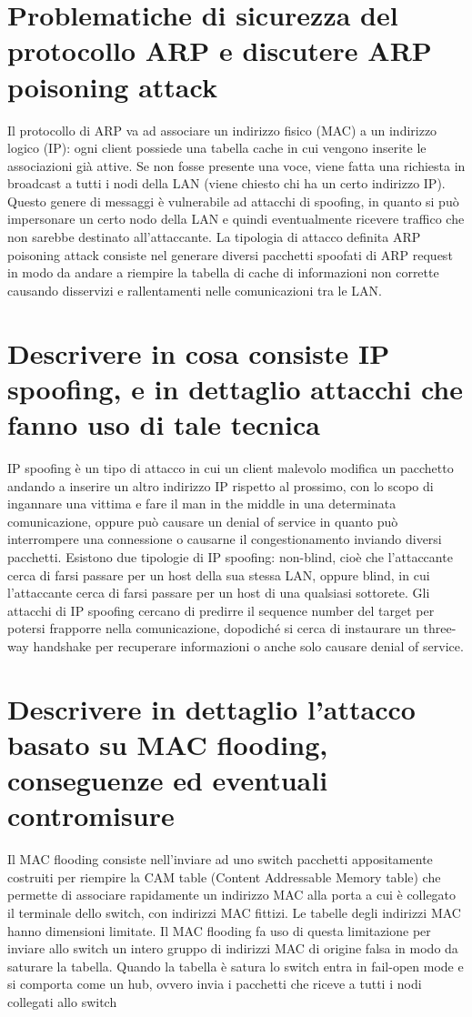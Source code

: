 \documentclass{report}
\begin{document}
\section{Problematiche di sicurezza del protocollo ARP e discutere ARP poisoning attack}
Il protocollo di ARP va ad associare un indirizzo fisico (MAC) a un indirizzo logico (IP): ogni client possiede una tabella cache in cui vengono inserite le associazioni già attive. Se non fosse presente una voce, viene fatta una richiesta in broadcast a tutti i nodi della LAN (viene chiesto chi ha un certo indirizzo IP).
Questo genere di messaggi è vulnerabile ad attacchi di spoofing, in quanto si può impersonare un certo nodo della LAN e quindi eventualmente ricevere traffico che non sarebbe destinato all’attaccante.
La tipologia di attacco definita ARP poisoning attack consiste nel generare diversi pacchetti spoofati di ARP request in modo da andare a riempire la tabella di cache di informazioni non corrette causando disservizi e rallentamenti nelle comunicazioni tra le LAN.

\section{Descrivere in cosa consiste IP spoofing, e in dettaglio attacchi che fanno uso di tale tecnica}
IP spoofing è un tipo di attacco in cui un client malevolo modifica un pacchetto andando a inserire un altro indirizzo IP rispetto al prossimo, con lo scopo di ingannare una vittima e fare il man in the middle in una determinata comunicazione, oppure può causare un denial of service in quanto può interrompere una connessione o causarne il congestionamento inviando diversi pacchetti.
Esistono due tipologie di IP spoofing: non-blind, cioè che l'attaccante cerca di farsi passare per un host della sua stessa LAN, oppure blind, in cui l’attaccante cerca di farsi passare per un host di una qualsiasi sottorete.
Gli attacchi di IP spoofing cercano di predirre il sequence number del target per potersi frapporre nella comunicazione, dopodiché si cerca di instaurare un three-way handshake per recuperare informazioni o anche solo causare denial of service.


\section{Descrivere in dettaglio l'attacco basato su MAC flooding, conseguenze ed eventuali contromisure}
Il MAC flooding consiste nell'inviare ad uno switch pacchetti appositamente costruiti per riempire la CAM table (Content Addressable Memory table) che permette di associare rapidamente un indirizzo MAC alla porta a cui è collegato il terminale dello switch, con indirizzi MAC fittizi.
Le tabelle degli indirizzi MAC hanno dimensioni limitate. Il MAC flooding fa uso di questa limitazione per inviare allo switch un intero gruppo di indirizzi MAC di origine falsa in modo da saturare la tabella. Quando la tabella è satura lo switch entra in fail-open mode e si comporta come un hub, ovvero invia i pacchetti che riceve a tutti i nodi collegati allo switch
\end{document}
